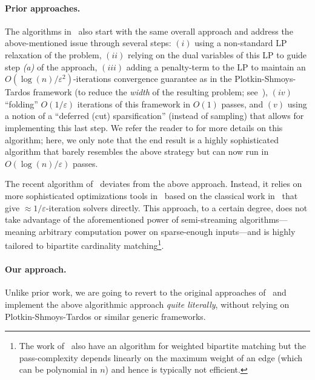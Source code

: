 \documentclass{theoretics}
\newcommand{\eps}{\varepsilon}
\begin{document}
\paragraph{Prior approaches.} The algorithms in~\cite{AhnG11b,AhnG15} also start with the same overall approach and address the above-mentioned issue through several steps: 
$(i)$ using a non-standard LP relaxation of the problem, $(ii)$ relying on the dual variables of this LP to guide step \emph{(a)} of the approach, $(iii)$ adding a penalty-term to the LP to maintain an $O(\log{\!(n)}/\eps^2)$-iterations
convergence guarantee as in the Plotkin-Shmoys-Tardos framework (to reduce the \emph{width} of the resulting problem; see~\cite{PlotkinST91,AroraHK12}), $(iv)$ ``folding'' $O(1/\eps)$ iterations of this framework in $O(1)$ passes, and $(v)$ using a notion of a 
``deferred (cut) sparsification'' (instead of sampling) that allows for implementing this last step. We refer the reader to \cite[Section 1 and 2 of arXiv version 3]{AhnG15} for more details on this algorithm; here, we only note
that the end result is a highly sophisticated algorithm that barely resembles the above strategy but can now run in $O(\log{\!(n)}/\eps)$ passes. 

The  recent algorithm of~\cite{AssadiJJST22} deviates from the above approach. Instead, it relies on more sophisticated optimizations tools in~\cite{Sherman17,JambulapatiST19,CohenST21} 
based on the classical work in~\cite{Nemirovski04,Nesterov07} that give $\approx 1/\eps$-iteration solvers directly. This approach, to a certain degree, does not take advantage of the aforementioned power of semi-streaming algorithms---meaning arbitrary computation power on sparse-enough inputs---and
is highly tailored to bipartite cardinality matching\footnote{The work of~\cite{AssadiJJST22} also have an algorithm for weighted bipartite matching but the pass-complexity depends linearly on the maximum weight of an edge (which can be polynomial in $n$) and hence is typically not  efficient.}.

\paragraph{Our approach.} Unlike prior work, we are going to revert to the original approaches of~\cite{LattanziMSV11,KumarMVV13} and 
implement the above algorithmic approach \emph{quite literally}, without relying on Plotkin-Shmoys-Tardos or similar generic frameworks. 
\end{document}
